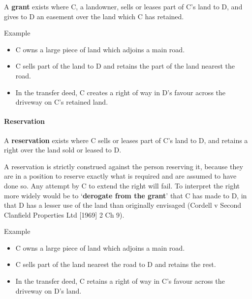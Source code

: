 \documentclass[
]{article}
\providecommand{\tightlist}{%
  \setlength{\itemsep}{0pt}\setlength{\parskip}{0pt}}
\newenvironment{env-de3101d4-f08b-48eb-bc0e-2fa06f3bcf8e}
{
    \savenotes\tcolorbox[blanker,breakable,left=5pt,borderline west={2pt}{-4pt}{purple}]
}
{
    \endtcolorbox\spewnotes
}
\begin{document}
A \textbf{grant} exists where C, a landowner, sells or leases part of
C's land to D, and gives to D an easement over the land which C has
retained.

\begin{env-de3101d4-f08b-48eb-bc0e-2fa06f3bcf8e}

Example

\begin{itemize}
\tightlist
\item
  C owns a large piece of land which adjoins a main road.
\item
  C sells part of the land to D and retains the part of the land nearest
  the road.
\item
  In the transfer deed, C creates a right of way in D's favour across
  the driveway on C's retained land.
\end{itemize}

\end{env-de3101d4-f08b-48eb-bc0e-2fa06f3bcf8e}

\hypertarget{reservation}{%
\paragraph{Reservation}\label{reservation}}

A \textbf{reservation} exists where C sells or leases part of C's land
to D, and retains a right over the land sold or leased to D.

A reservation is strictly construed against the person reserving it,
because they are in a position to reserve exactly what is required and
are assumed to have done so. Any attempt by C to extend the right will
fail. To interpret the right more widely would be to `\textbf{derogate
from the grant}' that C has made to D, in that D has a lesser use of the
land than originally envisaged (Cordell v Second Clanfield Properties
Ltd {[}1969{]} 2 Ch 9).

\begin{env-de3101d4-f08b-48eb-bc0e-2fa06f3bcf8e}

Example

\begin{itemize}
\tightlist
\item
  C owns a large piece of land which adjoins a main road.
\item
  C sells part of the land nearest the road to D and retains the rest.
\item
  In the transfer deed, C retains a right of way in C's favour across
  the driveway on D's land.
\end{itemize}

\end{env-de3101d4-f08b-48eb-bc0e-2fa06f3bcf8e}
\end{document}
